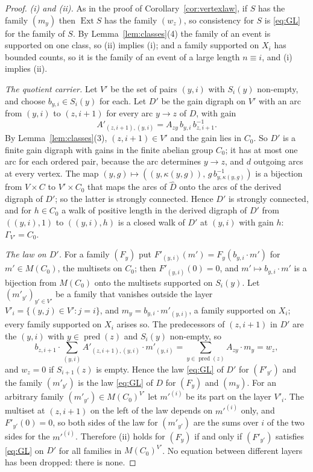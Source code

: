 \begin{proof}
\emph{(i) and (ii).} As in the proof of Corollary~\ref{cor:vertexlaw}, if $S$ has the family $(m_y)$ then $\operatorname{Ext}S$ has the family $(w_z)$, so consistency for $S$ is \eqref{eq:GL} for the family of $S$. By Lemma~\ref{lem:classes}(4) the family of an event is supported on one class, so (ii) implies (i); and a family supported on $X_i$ has bounded counts, so it is the family of an event of a large length $n\equiv i$, and (i) implies (ii).

\emph{The quotient carrier.} Let $V'$ be the set of pairs $(y,i)$ with $S_i(y)$ non-empty, and choose $b_{y,i}\in S_i(y)$ for each. Let $D'$ be the gain digraph on $V'$ with an arc from $(y,i)$ to $(z,i+1)$ for every arc $y\to z$ of $D$, with gain
\[
A'_{(z,i+1),(y,i)}=A_{zy}\,b_{y,i}\,b_{z,i+1}^{-1}.
\]
By Lemma~\ref{lem:classes}(3), $(z,i+1)\in V'$ and the gain lies in $C_0$. So $D'$ is a finite gain digraph with gains in the finite abelian group $C_0$; it has at most one arc for each ordered pair, because the arc determines $y\to z$, and $d$ outgoing arcs at every vertex. The map $(y,g)\mapsto((y,\kappa(y,g)),\,g\,b_{y,\kappa(y,g)}^{-1})$ is a bijection from $V\times C$ to $V'\times C_0$ that maps the arcs of $\hat D$ onto the arcs of the derived digraph of $D'$; so the latter is strongly connected. Hence $D'$ is strongly connected, and for $h\in C_0$ a walk of positive length in the derived digraph of $D'$ from $((y,i),1)$ to $((y,i),h)$ is a closed walk of $D'$ at $(y,i)$ with gain $h$: $\Gamma_{V'}=C_0$.

\emph{The law on $D'$.} For a family $(F_y)$ put $F'_{(y,i)}(m')=F_y(b_{y,i}\cdot m')$ for $m'\in M(C_0)$, the multisets on $C_0$; then $F'_{(y,i)}(0)=0$, and $m'\mapsto b_{y,i}\cdot m'$ is a bijection from $M(C_0)$ onto the multisets supported on $S_i(y)$. Let $(m'_{y'})_{y'\in V'}$ be a family that vanishes outside the layer $V'_i=\{(y,j)\in V':j=i\}$, and $m_y=b_{y,i}\cdot m'_{(y,i)}$, a family supported on $X_i$; every family supported on $X_i$ arises so. The predecessors of $(z,i+1)$ in $D'$ are the $(y,i)$ with $y\in\operatorname{pred}(z)$ and $S_i(y)$ non-empty, so
\[
b_{z,i+1}\cdot\sum_{(y,i)}A'_{(z,i+1),(y,i)}\cdot m'_{(y,i)}=\sum_{y\in\operatorname{pred}(z)}A_{zy}\cdot m_y=w_z ,
\]
and $w_z=0$ if $S_{i+1}(z)$ is empty. Hence the law \eqref{eq:GL} of $D'$ for $(F'_{y'})$ and the family $(m'_{y'})$ is the law \eqref{eq:GL} of $D$ for $(F_y)$ and $(m_y)$. For an arbitrary family $(m'_{y'})\in M(C_0)^{V'}$ let $m'^{(i)}$ be its part on the layer $V'_i$. The multiset at $(z,i+1)$ on the left of the law depends on $m'^{(i)}$ only, and $F'_{y'}(0)=0$, so both sides of the law for $(m'_{y'})$ are the sums over $i$ of the two sides for the $m'^{(i)}$. Therefore (ii) holds for $(F_y)$ if and only if $(F'_{y'})$ satisfies \eqref{eq:GL} on $D'$ for all families in $M(C_0)^{V'}$. No equation between different layers has been dropped: there is none.


\end{proof}
